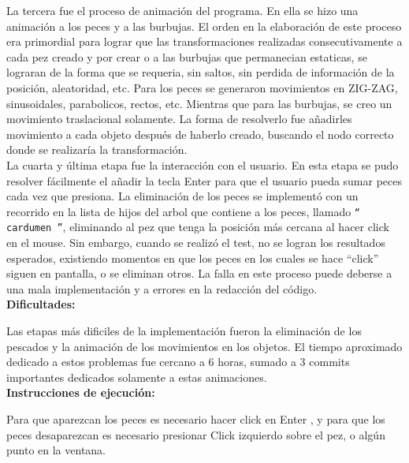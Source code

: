 \documentclass[letterpaper,11pt]{article}
\begin{document}
La tercera fue el proceso de animación del programa. En ella se hizo una animación a los peces y a las burbujas. El orden en la elaboración de este proceso era primordial para lograr que las transformaciones realizadas consecutivamente a cada pez creado y por crear o a las burbujas que permanecian estaticas, se lograran de la forma que se requeria, sin saltos, sin perdida de información de la posición, aleatoridad, etc. Para los peces se generaron movimientos en ZIG-ZAG, sinusoidales, parabolicos, rectos, etc. Mientras que para las burbujas, se creo un movimiento traslacional solamente. La forma de resolverlo fue añadirles movimiento a cada objeto después de haberlo creado, buscando el nodo correcto donde se realizaría la transformación.
\\

La cuarta y última etapa fue la interacción con el usuario. En esta etapa se pudo resolver fácilmente el añadir la tecla Enter para que el usuario pueda sumar peces cada vez que presiona. La eliminación de los peces se implementó con un recorrido en la lista de hijos del arbol que contiene a los peces, llamado \texttt{`` cardumen ''}, eliminando al pez que tenga la posición más cercana al hacer click en el mouse. Sin embargo, cuando se realizó el test, no se logran los resultados esperados, existiendo momentos en que los peces en los cuales se hace ``click'' siguen en pantalla, o se eliminan otros. La falla en este proceso puede deberse a una mala implementación y a errores en la redacción del código.
\\

\textbf{{ Dificultades:}}

Las etapas más dificiles de la implementación fueron la eliminación de los pescados y la animación de los movimientos en los objetos. El tiempo aproximado dedicado a estos problemas fue cercano a 6 horas, sumado a 3 commits importantes dedicados solamente a estas animaciones.
\\

\textbf{{ Instrucciones de ejecución:}}
\par

Para que aparezcan los peces es necesario hacer click en Enter \keys{\return}, y para que los peces desaparezcan es necesario presionar Click izquierdo sobre el pez, o algún punto en la ventana.
\\
\end{document}
